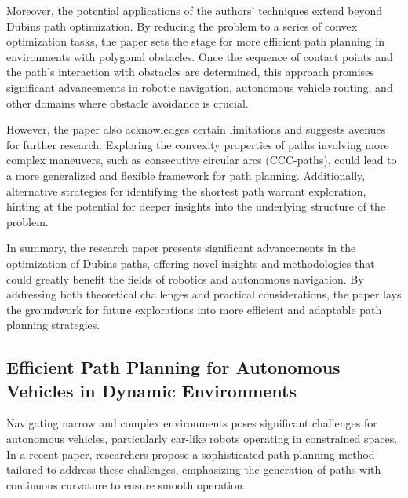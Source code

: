 \vspace*{6mm}

Moreover, the potential applications of the authors' techniques extend beyond Dubins path optimization. By reducing the problem to a series of convex optimization tasks, the paper sets the stage for more efficient path planning in environments with polygonal obstacles. Once the sequence of contact points and the path's interaction with obstacles are determined, this approach promises significant advancements in robotic navigation, autonomous vehicle routing, and other domains where obstacle avoidance is crucial.

\vspace*{6mm}

However, the paper also acknowledges certain limitations and suggests avenues for further research. Exploring the convexity properties of paths involving more complex maneuvers, such as consecutive circular arcs (CCC-paths), could lead to a more generalized and flexible framework for path planning. Additionally, alternative strategies for identifying the shortest path warrant exploration, hinting at the potential for deeper insights into the underlying structure of the problem.

\vspace*{6mm}

In summary, the research paper presents significant advancements in the optimization of Dubins paths, offering novel insights and methodologies that could greatly benefit the fields of robotics and autonomous navigation. By addressing both theoretical challenges and practical considerations, the paper lays the groundwork for future explorations into more efficient and adaptable path planning strategies.

\subsection{Efficient Path Planning for Autonomous Vehicles in Dynamic Environments}


Navigating narrow and complex environments poses significant challenges for autonomous vehicles, particularly car-like robots operating in constrained spaces. In a recent paper, researchers propose a sophisticated path planning method tailored to address these challenges, emphasizing the generation of paths with continuous curvature to ensure smooth operation.

\vspace*{6mm}

